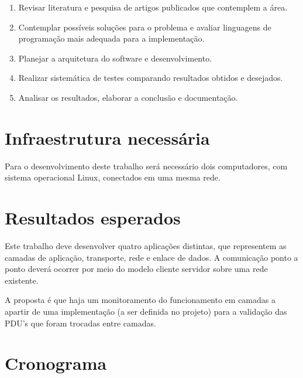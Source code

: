 \begin{enumerate}
	\item Revisar literatura e pesquisa de artigos publicados que contemplem a área.
	\item Contemplar possíveis soluções para o problema e avaliar linguagens de programação mais adequada para a implementação.
	\item Planejar a arquitetura do software e desenvolvimento.
	\item Realizar sistemática de testes comparando resultados obtidos e desejados.
	\item Analisar os resultados, elaborar a conclusão e documentação.
\end{enumerate}

\section{Infraestrutura necessária}
\label{infra}

Para o desenvolvimento deste trabalho será necessário dois computadores, com sistema operacional Linux, conectados em uma mesma rede.

\section{Resultados esperados}
\label{sec:organizacaoTrabalho}

Este trabalho deve desenvolver quatro aplicações distintas, que representem as camadas de aplicação, transporte, rede e enlace de dados. A comunicação ponto a ponto deverá ocorrer por meio do modelo cliente servidor sobre uma rede existente.

A proposta \'e que haja um monitoramento do funcionamento em camadas a apartir de uma implementa\c{c}\~ao (a ser definida no projeto) para a valida\c{c}\~ao das PDU's que foram trocadas entre camadas.



\section{Cronograma}
\label{cronos}

